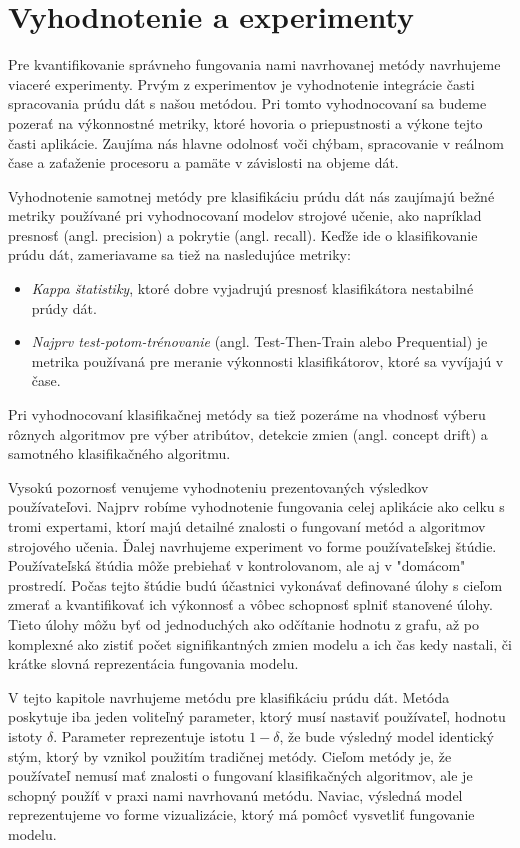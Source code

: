 \section{Vyhodnotenie a experimenty}
Pre kvantifikovanie správneho fungovania nami navrhovanej metódy navrhujeme viaceré experimenty. Prvým z experimentov je vyhodnotenie integrácie časti spracovania prúdu dát s našou metódou. Pri tomto vyhodnocovaní sa budeme pozerať na výkonnostné metriky, ktoré hovoria o priepustnosti a výkone tejto časti aplikácie. Zaujíma nás hlavne odolnosť voči chýbam, spracovanie v reálnom čase a zaťaženie procesoru a pamäte v závislosti na objeme dát.
\par
Vyhodnotenie samotnej metódy pre klasifikáciu prúdu dát nás zaujímajú bežné metriky používané pri vyhodnocovaní modelov strojové učenie, ako napríklad presnosť (angl. precision) a pokrytie (angl. recall). Keďže ide o klasifikovanie prúdu dát, zameriavame sa tiež na nasledujúce metriky:
\begin{itemize}
	\item \textit{Kappa štatistiky}, ktoré dobre vyjadrujú presnosť klasifikátora nestabilné prúdy dát.
	\item \textit{Najprv test-potom-trénovanie} (angl. Test-Then-Train alebo Prequential) je metrika používaná pre meranie výkonnosti klasifikátorov, ktoré sa vyvíjajú v čase.
\end{itemize}
Pri vyhodnocovaní klasifikačnej metódy sa tiež pozeráme na vhodnosť výberu rôznych algoritmov pre výber atribútov, detekcie zmien (angl. concept drift) a samotného klasifikačného algoritmu.
\par
Vysokú pozornosť venujeme vyhodnoteniu prezentovaných výsledkov používateľovi. Najprv robíme vyhodnotenie fungovania celej aplikácie ako celku s tromi expertami, ktorí majú detailné znalosti o fungovaní metód a algoritmov strojového učenia. Ďalej navrhujeme experiment vo forme používateľskej štúdie. Používateľská štúdia môže prebiehať v kontrolovanom, ale aj v "domácom" prostredí. Počas tejto štúdie budú účastnici vykonávať definované úlohy s cieľom zmerať a kvantifikovať ich výkonnosť a vôbec schopnosť splniť stanovené úlohy. Tieto úlohy môžu byť od jednoduchých ako odčítanie hodnotu z grafu, až po komplexné ako zistiť počet signifikantných zmien modelu a ich čas kedy nastali, či krátke slovná reprezentácia fungovania modelu.

\par
V tejto kapitole navrhujeme metódu pre klasifikáciu prúdu dát. Metóda poskytuje iba jeden voliteľný parameter, ktorý musí nastaviť používateľ, hodnotu istoty $\delta$. Parameter reprezentuje istotu $1-\delta$, že bude výsledný model identický stým, ktorý by vznikol použitím tradičnej metódy. Cieľom metódy je, že používateľ nemusí mať znalosti o fungovaní klasifikačných algoritmov, ale je schopný použíť v praxi nami navrhovanú metódu. Naviac, výsledná model reprezentujeme vo forme vizualizácie, ktorý má pomôcť vysvetliť fungovanie modelu.

